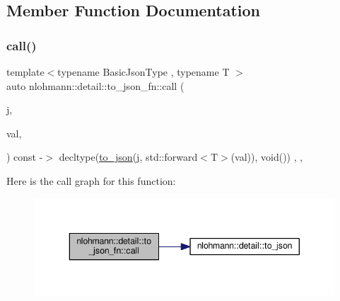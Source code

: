 \subsection{Member Function Documentation}
\mbox{\label{structnlohmann_1_1detail_1_1to__json__fn_ada2ce804ebf3b55f6e3e46ff3a055394}} 
\subsubsection{\texorpdfstring{call()}{call()}\hspace{0.1cm}{\footnotesize\ttfamily [1/2]}}
{\footnotesize\ttfamily template$<$typename Basic\+Json\+Type , typename T $>$ \\
auto nlohmann\+::detail\+::to\+\_\+json\+\_\+fn\+::call (\begin{DoxyParamCaption}\item[{Basic\+Json\+Type \&}]{j,  }\item[{T \&\&}]{val,  }\item[{\hyperlink{structnlohmann_1_1detail_1_1priority__tag}{priority\+\_\+tag}$<$ 1 $>$}]{ }\end{DoxyParamCaption}) const -\/$>$ decltype(\hyperlink{namespacenlohmann_1_1detail_a1a804b98cbe89b7e44b698f2ca860490}{to\+\_\+json}(j, std\+::forward$<$T$>$(val)), void())
    \hspace{0.3cm}{\ttfamily [inline]}, {\ttfamily [private]}, {\ttfamily [noexcept]}}

Here is the call graph for this function\+:\nopagebreak
\begin{figure}[H]
\begin{center}
\leavevmode
\includegraphics[width=343pt]{structnlohmann_1_1detail_1_1to__json__fn_ada2ce804ebf3b55f6e3e46ff3a055394_cgraph}
\end{center}
\end{figure}
\mbox{\label{structnlohmann_1_1detail_1_1to__json__fn_adbd2247cecd3cdd072f9a28ef84e85f4}} 

